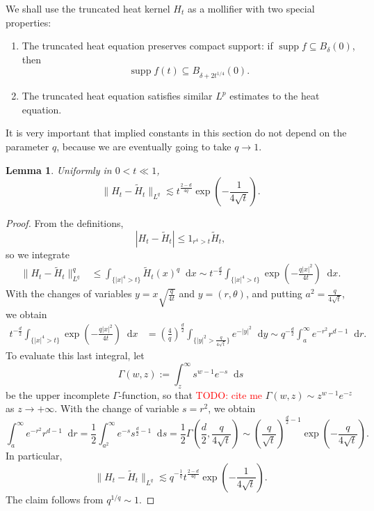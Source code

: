\documentclass[reqno,11pt]{amsart}
\newcommand*\dif{\mathop{}\!\mathrm{d}}
\DeclareMathOperator{\supp}{supp}
\newtheorem{lemma}[theorem]{Lemma}
\theoremstyle{definition}
\numberwithin{equation}{section}
\newcommand\todo[1]{\textcolor{red}{TODO: #1}}
\begin{document}
We shall use the truncated heat kernel $H_t$ as a mollifier with two special properties:
\begin{enumerate}
\item The truncated heat equation preserves compact support: if $\supp f \subseteq B_\delta(0)$, then
\begin{equation}\label{support bounds on heat kernel}
\supp f(t) \subseteq B_{\delta + 2t^{1/4}}(0).
\end{equation}
\item The truncated heat equation satisfies similar $L^p$ estimates to the heat equation.
\end{enumerate}
It is very important that implied constants in this section do not depend on the parameter $q$, because we are eventually going to take $q \to 1$.

\begin{lemma}\label{approximation by heat kernels}
Uniformly in $0 < t \ll 1$,
$$\|H_t - \tilde H_t\|_{L^q} \lesssim t^{\frac{2 - d}{4q}} \exp\left(-\frac{1}{4 \sqrt t}\right).$$
\end{lemma}
\begin{proof}
From the definitions,
$$|H_t - \tilde H_t| \leq 1_{r^4 > t} \tilde H_t,$$
so we integrate 
\begin{align*}
\|H_t - \tilde H_t\|_{L^q}^q
&\leq \int_{\{|x|^4 > t\}} \tilde H_t(x)^q \dif x \sim t^{-\frac{d}{2}} \int_{\{|x|^4 > t\}} \exp\left(-\frac{q|x|^2}{4t}\right) \dif x.
\end{align*}
With the changes of variables $y = x \sqrt{\frac{q}{4t}}$ and $y = (r, \theta)$, and putting $a^2 = \frac{q}{4 \sqrt t}$, we obtain 
\begin{align*}
t^{-\frac{d}{2}} \int_{\{|x|^4 > t\}} \exp\left(-\frac{q|x|^2}{4t}\right) \dif x
&= \left(\frac{4}{q}\right)^{\frac{d}{2}} \int_{\{|y|^2 > \frac{q}{4\sqrt t}\}} e^{-|y|^2} \dif y \sim q^{-\frac{d}{2}} \int_a^\infty e^{-r^2} r^{d - 1} \dif r.
\end{align*}
To evaluate this last integral, let
$$\Gamma(w, z) := \int_z^\infty s^{w - 1} e^{-s} \dif s$$
be the upper incomplete $\Gamma$-function, so that \todo{cite me} $\Gamma(w, z) \sim z^{w - 1} e^{-z}$ as $z \to +\infty$.
With the change of variable $s = r^2$, we obtain 
$$\int_a^\infty e^{-r^2} r^{d - 1} \dif r = \frac{1}{2} \int_{a^2}^\infty e^{-s} s^{\frac{d}{2} - 1} \dif s = \frac{1}{2} \Gamma\left(\frac{d}{2}, \frac{q}{4 \sqrt t}\right) \sim \left(\frac{q}{\sqrt t}\right)^{\frac{d}{2} - 1} \exp\left(-\frac{q}{4 \sqrt t}\right).$$
In particular,
$$\|H_t - \tilde H_t\|_{L^q} \lesssim q^{-\frac{1}{q}} t^{\frac{2 - d}{4q}} \exp\left(-\frac{1}{4 \sqrt t}\right).$$
The claim follows from $q^{1/q} \sim 1$.
\end{proof}
\end{document}
